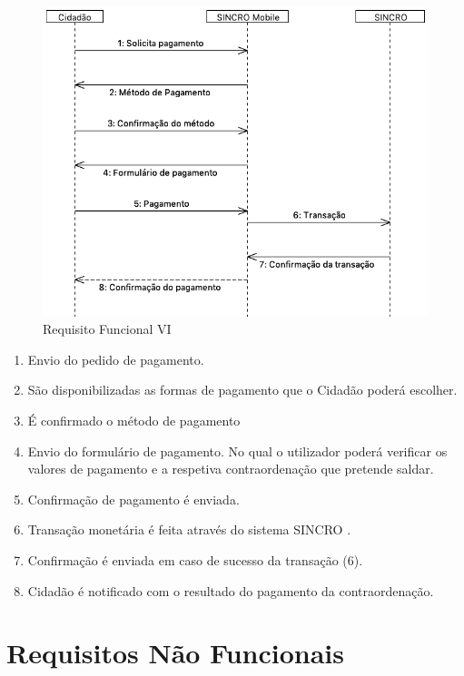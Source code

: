 \documentclass{article}
\begin{document}
\begin{figure}
\centering
\includegraphics[scale=0.3]{./adoc_images/sequence/rf06.png}
\caption{Requisito Funcional VI}
\end{figure}

\begin{enumerate}
\def\labelenumi{\arabic{enumi}.}
\item
  Envio do pedido de pagamento.
\item
  São disponibilizadas as formas de pagamento que o Cidadão poderá
  escolher.
\item
  É confirmado o método de pagamento
\item
  Envio do formulário de pagamento. No qual o utilizador poderá
  verificar os valores de pagamento e a respetiva contraordenação que
  pretende saldar.
\item
  Confirmação de pagamento é enviada.
\item
  Transação monetária é feita através do sistema SINCRO .
\item
  Confirmação é enviada em caso de sucesso da transação (6).
\item
  Cidadão é notificado com o resultado do pagamento da contraordenação.
\end{enumerate}

\hypertarget{_requisitos_n_o_funcionais}{%
\section{Requisitos Não Funcionais}\label{_requisitos_n_o_funcionais}}
\end{document}
